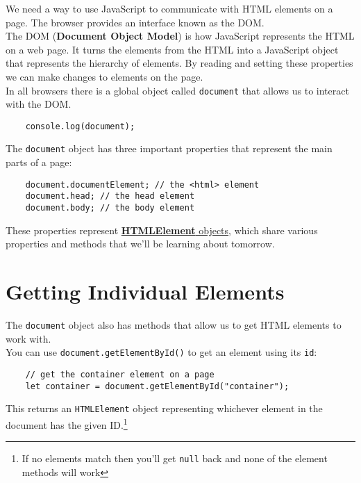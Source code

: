 We need a way to use JavaScript to communicate with HTML elements on a page. The browser provides an interface known as the DOM.
\\

The DOM (\textbf{Document Object Model}) is how JavaScript represents the HTML on a web page. It turns the elements from the HTML into a JavaScript object that represents the hierarchy of elements. By reading and setting these properties we can make changes to elements on the page.
\\

In all browsers there is a global object called \texttt{document} that allows us to interact with the DOM.

\begin{verbatim}
    console.log(document);
\end{verbatim}

The \texttt{document} object has three important properties that represent the main parts of a page:

\begin{verbatim}
    document.documentElement; // the <html> element
    document.head; // the head element
    document.body; // the body element
\end{verbatim}

These properties represent \href{https://developer.mozilla.org/en-US/docs/Web/API/HTMLElement}{\textbf{HTMLElement} objects}, which share various properties and methods that we'll be learning about tomorrow.

\pagebreak

\section{Getting Individual Elements}

The \texttt{document} object also has methods that allow us to get HTML elements to work with.
\\

You can use \texttt{document.getElementById()} to get an element using its \texttt{id}:

\begin{verbatim}
    // get the container element on a page
    let container = document.getElementById("container");
\end{verbatim}

This returns an \texttt{HTMLElement} object representing whichever element in the document has the given ID.\footnote{If no elements match then you'll get \texttt{null} back and none of the element methods will work}
\\

